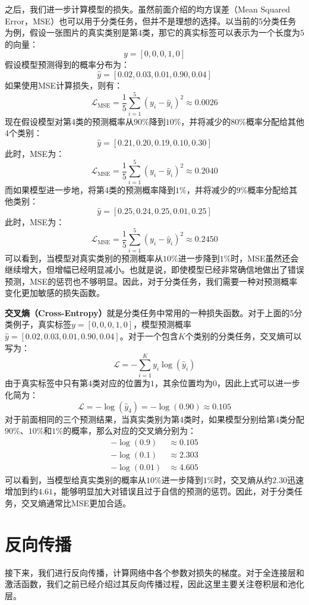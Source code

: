 之后，我们进一步计算模型的损失。虽然前面介绍的均方误差（Mean Squared Error，MSE）也可以用于分类任务，但并不是理想的选择。以当前的5分类任务为例，假设一张图片的真实类别是第4类，那它的真实标签可以表示为一个长度为$5$的向量：
$$
y=[0,0,0,1,0]
$$
假设模型预测得到的概率分布为：
$$
\hat{y}=[0.02,0.03,0.01,0.90,0.04]
$$
如果使用MSE计算损失，则有：
$$
\mathcal{L}_{\mathrm{MSE}} = \frac{1}{5}\sum_{i=1}^{5}(y_i-\hat{y}_i)^2 \approx0.0026
$$
现在假设模型对第4类的预测概率从$90\%$降到$10\%$，并将减少的$80\%$概率分配给其他4个类别：
$$
\hat{y}=[0.21,0.20,0.19,0.10,0.30]
$$
此时，MSE为：
$$
\mathcal{L}_{\mathrm{MSE}} = \frac{1}{5}\sum_{i=1}^{5}(y_i-\hat{y}_i)^2 \approx0.2040
$$
而如果模型进一步地，将第4类的预测概率降到$1\%$，并将减少的$9\%$概率分配给其他类别：
$$
\hat{y}=[0.25,0.24,0.25,0.01,0.25]
$$
此时，MSE为：
$$
\mathcal{L}_{\mathrm{MSE}}=\frac{1}{5}\sum_{i=1}^{5}(y_i-\hat{y}_i)^2\approx0.2450
$$
可以看到，当模型对真实类别的预测概率从$10\%$进一步降到$1\%$时，MSE虽然还会继续增大，但增幅已经明显减小。也就是说，即使模型已经非常确信地做出了错误预测，MSE的惩罚也不够明显。因此，对于分类任务，我们需要一种对预测概率变化更加敏感的损失函数。

\textbf{交叉熵（Cross-Entropy）}就是分类任务中常用的一种损失函数。对于上面的5分类例子，真实标签$y=[0,0,0,1,0]$，模型预测概率$\hat{y}=[0.02,0.03,0.01,0.90,0.04]$。对于一个包含$K$个类别的分类任务，交叉熵可以写为：
$$
\mathcal{L} = -\sum_{i=1}^{K}y_i\log(\hat{y}_i)
$$
由于真实标签中只有第4类对应的位置为$1$，其余位置均为$0$，因此上式可以进一步化简为：
$$
\mathcal{L}=-\log(\hat{y}_4)=-\log(0.90)\approx0.105
$$
对于前面相同的三个预测结果，当真实类别为第4类时，如果模型分别给第4类分配$90\%$、$10\%$和$1\%$的概率，那么对应的交叉熵分别为：
$$
\begin{aligned}
-\log(0.9) &\approx 0.105\\
-\log(0.1) &\approx 2.303\\
-\log(0.01) &\approx 4.605
\end{aligned}
$$
可以看到，当模型给真实类别的概率从$10\%$进一步降到$1\%$时，交叉熵从约$2.30$迅速增加到约$4.61$，能够明显加大对错误且过于自信的预测的惩罚。因此，对于分类任务，交叉熵通常比MSE更加合适。

\section{反向传播}

接下来，我们进行反向传播，计算网络中各个参数对损失的梯度。对于全连接层和激活函数，我们之前已经介绍过其反向传播过程，因此这里主要关注卷积层和池化层。

